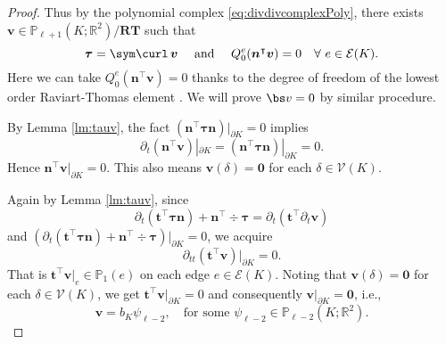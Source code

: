 \begin{proof}
\medskip

Thus by the polynomial complex \eqref{eq:divdivcomplexPoly}, there exists $\boldsymbol  v\in\mathbb P_{\ell+1}(K;\mathbb R^2)/\boldsymbol {RT}$ such that
\[
\boldsymbol \tau=\sym\curl \, \boldsymbol  v\quad \textrm{ and }\quad Q_{0}^e(\boldsymbol  n^{\intercal}\boldsymbol  v)=0\quad\forall~e\in\mathcal E(K).
\]
Here we can take $Q_{0}^e(\boldsymbol  n^{\intercal}\boldsymbol  v)=0$ thanks to the degree of freedom of the lowest order Raviart-Thomas element \cite{RaviartThomas1977}. We will prove $\bs v = 0$ by similar procedure. 

By Lemma \ref{lm:tauv}, the fact $(\boldsymbol  n^{\intercal}\boldsymbol \tau\boldsymbol  n)|_{\partial K}=0$ implies
\[
\partial_t(\boldsymbol  n^{\intercal}\boldsymbol  v)|_{\partial K}= (\boldsymbol  n^{\intercal}\boldsymbol \tau\boldsymbol  n)|_{\partial K}=0.
\]
Hence $\boldsymbol  n^{\intercal}\boldsymbol  v|_{\partial K}=0$.
This also means $\boldsymbol  v(\delta)=\boldsymbol 0$ for each $\delta\in\mathcal V(K)$.

Again by Lemma \ref{lm:tauv}, since
\begin{equation*}%
\partial_{t}(\boldsymbol  t^{\intercal}\boldsymbol \tau\boldsymbol  n)+\boldsymbol  n^{\intercal}\div\boldsymbol \tau= \partial_t(\boldsymbol  t^{\intercal}\partial_t\boldsymbol  v)
\end{equation*}
and $(\partial_{t}(\boldsymbol  t^{\intercal}\boldsymbol \tau\boldsymbol  n)+\boldsymbol  n^{\intercal}\div\boldsymbol \tau)|_{\partial K}=0$, we acquire
\[
\partial_{tt}(\boldsymbol  t^{\intercal}\boldsymbol  v)|_{\partial K}=0.
\]
That is $\boldsymbol  t^{\intercal}\boldsymbol  v|_e\in\mathbb P_1(e)$ on each edge $e\in\mathcal E(K)$. Noting that $\boldsymbol  v(\delta)=\boldsymbol 0$ for each $\delta\in\mathcal V(K)$, we get $\boldsymbol  t^{\intercal}\boldsymbol  v|_{\partial K}=0$ and consequently $\boldsymbol  v|_{\partial K}=\boldsymbol 0$, i.e., 
$$
\boldsymbol  v = b_K\psi_{\ell-2},\quad \text{for some } \psi_{\ell-2} \in \mathbb P_{\ell-2}(K;\mathbb R^2).
$$


\end{proof}
